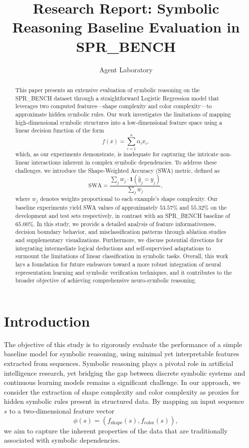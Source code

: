 \documentclass{article}
\title{Research Report: Symbolic Reasoning Baseline Evaluation in SPR\_BENCH}
\author{Agent Laboratory}
\date{}
\begin{document}
\maketitle

\begin{abstract}
This paper presents an extensive evaluation of symbolic reasoning on the SPR\_BENCH dataset through a straightforward Logistic Regression model that leverages two computed features—shape complexity and color complexity—to approximate hidden symbolic rules. Our work investigates the limitations of mapping high-dimensional symbolic structures into a low-dimensional feature space using a linear decision function of the form 
\[
f(x)=\sum_{i=1}^{n}\alpha_i x_i,
\]
which, as our experiments demonstrate, is inadequate for capturing the intricate non-linear interactions inherent in complex symbolic dependencies. To address these challenges, we introduce the Shape-Weighted Accuracy (SWA) metric, defined as 
\[
\text{SWA}=\frac{\sum_{j}w_j\cdot\mathbf{1}(\hat{y}_j=y_j)}{\sum_{j}w_j},
\]
where \(w_j\) denotes weights proportional to each example's shape complexity. Our baseline experiments yield SWA values of approximately \(53.57\%\) and \(55.32\%\) on the development and test sets respectively, in contrast with an SPR\_BENCH baseline of \(65.00\%\). In this study, we provide a detailed analysis of feature informativeness, decision boundary behavior, and misclassification patterns through ablation studies and supplementary visualizations. Furthermore, we discuss potential directions for integrating intermediate logical deductions and self-supervised adaptations to surmount the limitations of linear classification in symbolic tasks. Overall, this work lays a foundation for future endeavors toward a more robust integration of neural representation learning and symbolic verification techniques, and it contributes to the broader objective of achieving comprehensive neuro-symbolic reasoning.
\end{abstract}

\section{Introduction}
The objective of this study is to rigorously evaluate the performance of a simple baseline model for symbolic reasoning, using minimal yet interpretable features extracted from sequences. Symbolic reasoning plays a pivotal role in artificial intelligence research, yet bridging the gap between discrete symbolic systems and continuous learning models remains a significant challenge. In our approach, we consider the extraction of shape complexity and color complexity as proxies for hidden symbolic rules present in structured data. By mapping an input sequence \( s \) to a two-dimensional feature vector 
\[
\phi(s) = \left(f_{\text{shape}}(s), f_{\text{color}}(s)\right),
\]
we aim to capture the inherent properties of the data that are traditionally associated with symbolic dependencies.
\end{document}
